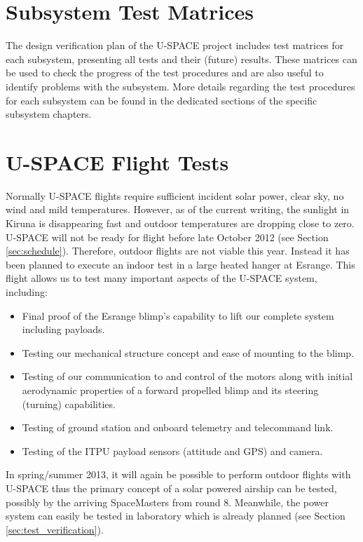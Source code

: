 \section{Subsystem Test Matrices}
%
The design verification plan of the \ac{U-SPACE} project includes test matrices for each subsystem, presenting all tests and their (future) results. These matrices can be used to check the progress of the test procedures and are also useful to identify problems with the subsystem. More details regarding the test procedures for each subsystem can be found in the dedicated sections of the specific subsystem chapters.
%
%
\section{U-SPACE Flight Tests}
%
Normally \ac{U-SPACE} flights require sufficient incident solar power, clear sky, no wind and mild temperatures. However, as of the current writing, the sunlight in Kiruna is disappearing fast and outdoor temperatures are dropping close to zero. \ac{U-SPACE} will not be ready for flight before late October 2012 (see Section \ref{sec:schedule}). Therefore, outdoor flights are not viable this year. Instead it has been planned to execute an indoor test in a large heated hanger at Esrange. This flight allows us to test many important aspects of the \ac{U-SPACE} system, including:
%
\begin{itemize}
\item Final proof of the Esrange blimp's capability to lift our complete system including payloads.
\item Testing our mechanical structure concept and ease of mounting to the blimp.
\item Testing of our communication to and control of the motors along with initial aerodynamic properties of a forward propelled blimp and its steering (turning) capabilities.
\item Testing of ground station and onboard telemetry and telecommand link.
\item Testing of the \ac{ITPU} payload sensors (attitude and GPS) and camera.
\end{itemize}
%
%
In spring/summer 2013, it will again be possible to perform outdoor flights with \ac{U-SPACE} thus the primary concept of a solar powered airship can be tested, possibly by the arriving SpaceMasters from round 8. Meanwhile, the power system can easily be tested in laboratory which is already planned (see Section \ref{sec:test_verification}).
%